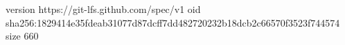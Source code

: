 version https://git-lfs.github.com/spec/v1
oid sha256:1829414e35fdeab31077d87dcff7dd482720232b18dcb2c66570f3523f744574
size 660
